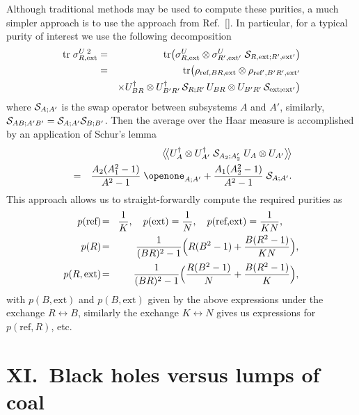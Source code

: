 \documentclass[aps,showpacs,prl,12pt]{revtex4}
\begin{document}
Although traditional methods \cite{Melloapp} may be used to compute these
purities, a much simpler approach is to use the approach from
Ref.~[]. In particular, for a typical purity
of interest we use the following decomposition
\begin{eqnarray}
\text{tr}\; \sigma_{R,\text{ext}}^{U\;2}
&=& \text{tr} \bigl( \sigma_{R,\text{ext}}^U
\otimes \sigma_{R',\text{ext}'}^U \;
{\cal S}_{R,\text{ext};R',\text{ext}'}\bigr)\\
&=& \text{tr} \bigl( \rho_{\text{ref},BR,\text{ext}}\otimes
\rho_{\text{ref}',B'R',\text{ext}'}\nonumber\\
&&\times U_{BR}^\dagger\otimes U_{B'R'}^\dagger\,
{\cal S}_{R;R'}\, U_{BR}\otimes U_{B'R'}\,
{\cal S}_{\text{ext};\text{ext}'} \bigr) \nonumber
\end{eqnarray}
where ${\cal S}_{A;A'}$ is the swap operator between 
subsystems $A$ and $A'$, similarly,
${\cal S}_{AB;A'B'}={\cal S}_{A;A'}{\cal S}_{B;B'}$. Then the average
over the Haar measure is accomplished by an application of Schur's
lemma \cite{Abey06app}
\begin{eqnarray}
&&\bigl\langle\!\bigl\langle U_A^\dagger\otimes U_{A'}^\dagger\;
{\cal S}_{A_2;A_2'}\; U_A \otimes U_{A'}\bigr\rangle\!\bigr\rangle
\nonumber \\
&=&\frac{A_2(A_1^2-1)}{A^2-1}\;\openone_{A;A'}
+\frac{A_1(A_2^2-1)}{A^2-1}\;{\cal S}_{A;A'}.
\end{eqnarray}
This approach allows us to straight-forwardly compute the required
purities as
\begin{eqnarray}
p(\text{ref})\!&=&\!\frac{1}{K},\quad
p(\text{ext})=\frac{1}{N},\quad
p(\text{ref,ext})=\frac{1}{KN},~~~~~ \nonumber \\
p(R)\!&=&\!\frac{1}{(BR)^2-1}
\Bigl( R(B^2-1)+\frac{B(R^2-1)}{KN}\Bigr), \label{HJS} \\ %
p(R,\text{ext})\!&=&\!\frac{1}{(BR)^2-1}
\Bigl( \frac{R(B^2-1)}{N}+\frac{B(R^2-1)}{K}\Bigr), \nonumber
\end{eqnarray}
with $p(B,\text{ext})$ and $p(B,\text{ext})$ given by the
above expressions under the exchange $R\leftrightarrow B$, similarly
the exchange $K\leftrightarrow N$ gives us expressions for
$p(\text{ref},R)$, etc.

\section{XI.\ Black holes versus lumps of coal}
\label{coal}
\end{document}
